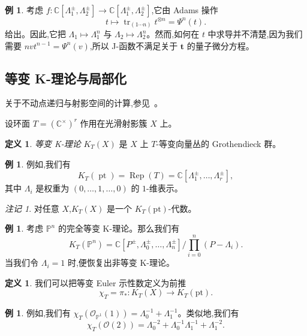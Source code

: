 \documentclass{amsart}
\theoremstyle{definition}
\newtheorem{defn}[thm]{定义}
\newtheorem{exm}[thm]{例}
\theoremstyle{remark}
\newtheorem{rmk}[thm]{注记}
\theoremstyle{plain}
\theoremstyle{definition}
\theoremstyle{remark}
\newcommand{\C}{\mathbb{C}}
\renewcommand{\P}{\mathbb{P}}
\newcommand{\mc}[1]{\mathcal{#1}}
\newcommand{\mr}[1]{\mathrm{#1}}
\newcommand{\on}[1]{\operatorname{#1}}
\newcommand{\1}{\mathbf{1}}
\newcommand{\2}{\mathbf{2}}
\newcommand{\3}{\mathbf{3}}
\begin{document}
\begin{exm}
    考虑 \(f \colon \C[\Lambda_1^{\pm}, \Lambda_2^{\pm}] \to \C[\Lambda_1^{\pm}, \Lambda_2^{\pm}]\),它由 Adams 操作
    \[ t \mapsto \on{tr}_{(1\cdots n)} t^{\otimes n} = \Psi^n (t). \]
    给出。因此,它把 \(\Lambda_1 \mapsto \Lambda_1^n\) 与 \(\Lambda_2 \mapsto \Lambda_2^n\)。然而,如何在 \(t\) 中求导并不清楚,因为我们需要 \(nv t^{n-1} = \Psi^n(v)\),所以 J-函数不满足关于 \(\mathbf{t}\) 的量子微分方程。
\end{exm}

\subsection{等变 K-理论与局部化}%
\label{sub:Equivariant K-theory and localization}

关于不动点递归与射影空间的计算,参见~\cite{GiventalK2}。

设环面 \(T = (\C^{\times})^r\) 作用在光滑射影簇 \(X\) 上。

\begin{defn}
    \textit{等变 K-理论} \(K_T(X)\) 是 \(X\) 上 \(T\)-等变向量丛的 Grothendieck 群。
\end{defn}

\begin{exm}
    例如,我们有
    \[ K_T(\on{pt}) = \on{Rep}(T) = \C[\Lambda_1^{\pm}, \ldots, \Lambda_r^{\pm}], \]
    其中 \(\Lambda_i\) 是权重为 \((0, \ldots, 1, \ldots, 0)\) 的 \(1\)-维表示。
\end{exm}

\begin{rmk}
    对任意 \(X\),\(K_T(X)\) 是一个 \(K_T(\mr{pt})\)-代数。
\end{rmk}

\begin{exm}
    考虑 \(\P^n\) 的完全等变 K-理论。那么我们有
    \[ K_T(\P^n) = \C[P^{\pm}, \Lambda_0^{\pm}, \ldots, \Lambda_n^{\pm}] \big/ \prod_{i=0}^n (P-\Lambda_i). \]
    当我们令 \(\Lambda_i = 1\) 时,便恢复出非等变 K-理论。
\end{exm}

\begin{defn}
    我们可以把等变 Euler 示性数定义为前推
    \[ \chi_T = \pi_* \colon K_T(X) \to K_T(\mr{pt}). \]
\end{defn}

\begin{exm}
    例如,我们有 \(\chi_T(\mc{O}_{\P^1}(1)) = \Lambda_0^{-1} + \Lambda_1^{-1}\)。类似地,我们有
    \[ \chi_T(\mc{O}(2)) = \Lambda_0^{-2} + \Lambda_0^{-1} \Lambda_1^{-1} + \Lambda_1^{-2}. \]
\end{exm}
\end{document}
